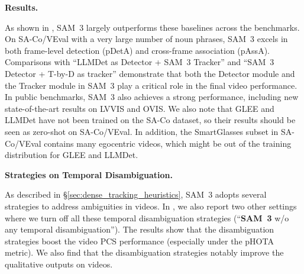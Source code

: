 \documentclass[]{fairmeta}
\newcommand{\model}{SAM~3\xspace}
\newcommand{\dsname}{{SA-Co}\xspace}
\newcommand{\evalvid}{{\dsname/VEval}\xspace}
\renewcommand{\paragraph}[1]{%
	\noindent\textbf{#1.}\noindent\xspace%
}
\begin{document}
		\paragraph{Results}
		As shown in , \model largely outperforms these baselines across the benchmarks. On \evalvid with a very large number of noun phrases, \model excels in both frame-level detection (pDetA) and cross-frame association (pAssA). Comparisons with ``LLMDet as Detector + \model Tracker'' and ``\model Detector + T-by-D as tracker'' demonstrate that both the Detector module and the Tracker module in \model play a critical role in the final video performance. In public benchmarks, \model also achieves a strong performance, including new state-of-the-art results on LVVIS and OVIS. We also note that GLEE and LLMDet have not been trained on the \dsname dataset, so their results should be seen as zero-shot on \evalvid. In addition, the SmartGlasses subset in \evalvid contains many egocentric videos, which might be out of the training distribution for GLEE and LLMDet.
		
		\paragraph{Strategies on Temporal Disambiguation}
		As described in \S\ref{sec:dense_tracking_heuristics}, \model adopts several strategies to address ambiguities in videos. In , we also report two other settings where we turn off all these temporal disambiguation strategies (``\textbf{\model} w/o any temporal disambiguation''). %
        The results show that the disambiguation strategies boost the video PCS performance (especially under the pHOTA metric). We also find that the disambiguation strategies %
        notably improve the qualitative outputs on videos.
		
\end{document}
